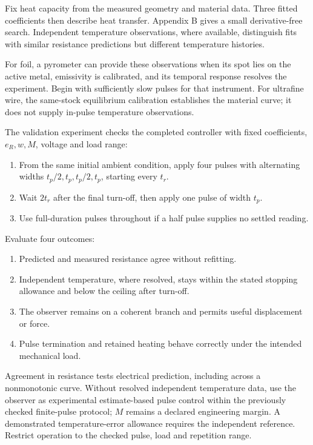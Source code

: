 \documentclass[11pt,letterpaper]{article}
\begin{document}
Fix heat capacity from the measured geometry and material data. Three fitted coefficients then describe heat transfer. Appendix B gives a small derivative-free search. Independent temperature observations, where available, distinguish fits with similar resistance predictions but different temperature histories.

For foil, a pyrometer can provide these observations when its spot lies on the active metal, emissivity is calibrated, and its temporal response resolves the experiment. Begin with sufficiently slow pulses for that instrument. For ultrafine wire, the same-stock equilibrium calibration establishes the material curve; it does not supply in-pulse temperature observations.

The validation experiment checks the completed controller with fixed coefficients, \(e_R,w,M\), voltage and load range:

\begin{enumerate}[start=1]
\item From the same initial ambient condition, apply four pulses with alternating widths \(t_p/2,t_p,t_p/2,t_p\), starting every \(t_r\).
\item Wait \(2t_r\) after the final turn-off, then apply one pulse of width \(t_p\).
\item Use full-duration pulses throughout if a half pulse supplies no settled reading.
\end{enumerate}

Evaluate four outcomes:

\begin{enumerate}[start=1]
\item Predicted and measured resistance agree without refitting.
\item Independent temperature, where resolved, stays within the stated stopping allowance and below the ceiling after turn-off.
\item The observer remains on a coherent branch and permits useful displacement or force.
\item Pulse termination and retained heating behave correctly under the intended mechanical load.
\end{enumerate}

Agreement in resistance tests electrical prediction, including across a nonmonotonic curve. Without resolved independent temperature data, use the observer as experimental estimate-based pulse control within the previously checked finite-pulse protocol; \(M\) remains a declared engineering margin. A demonstrated temperature-error allowance requires the independent reference. Restrict operation to the checked pulse, load and repetition range.
\end{document}
